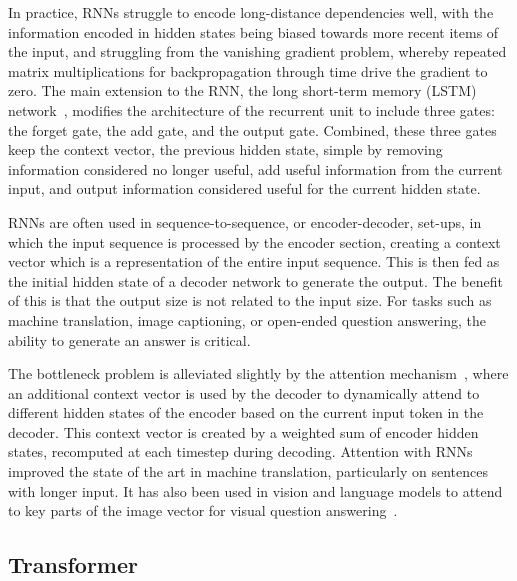 In practice, RNNs struggle to encode long-distance dependencies well, with the
information encoded in hidden states being biased towards more recent items of
the input, and struggling from the vanishing gradient problem, whereby repeated
matrix multiplications for backpropagation through time drive the gradient to
zero. The main extension to the RNN, the long short-term memory (LSTM)
network~\citep{hochreiter1997lstm}, modifies the architecture of the recurrent
unit to include three gates: the forget gate, the add gate, and the output
gate. Combined, these three gates keep the context vector, the previous hidden
state, simple by removing information considered no longer useful, add useful
information from the current input, and output information considered useful
for the current hidden state.

RNNs are often used in sequence-to-sequence, or encoder-decoder, set-ups, in
which the input sequence is processed by the encoder section, creating a
context vector which is a representation of the entire input sequence. This is
then fed as the initial hidden state of a decoder network to generate the
output. The benefit of this is that the output size is not related to the input
size. For tasks such as machine translation, image captioning, or open-ended
question answering, the ability to generate an answer is critical.

The bottleneck problem is alleviated slightly by the attention
mechanism~\citep{bahdanau2015attention}, where an additional context vector is
used by the decoder to dynamically attend to different hidden states of the
encoder based on the current input token in the decoder. This context vector is
created by a weighted sum of encoder hidden states, recomputed at each timestep
during decoding. Attention with RNNs improved the state of the art in machine
translation, particularly on sentences with longer input. It has also been used
in vision and language models to attend to key parts of the image vector
for visual question answering~\citep{yang2016san}.


\subsection{Transformer}
\label{ssec:transformer}

